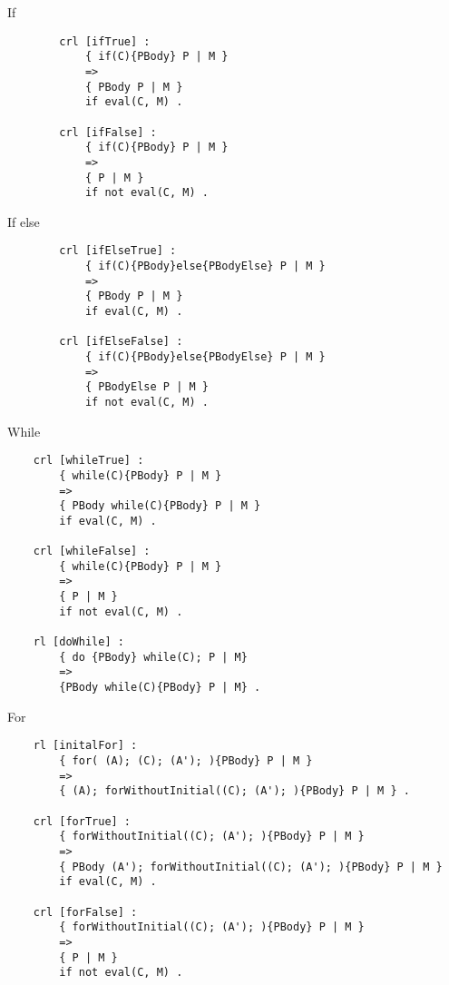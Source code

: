 \documentclass{beamer}
\begin{document}
    \begin{frame}[fragile]{If}
        \begin{verbatim}  
        crl [ifTrue] :
            { if(C){PBody} P | M }
            => 
            { PBody P | M } 
            if eval(C, M) .
    
        crl [ifFalse] :
            { if(C){PBody} P | M }
            => 
            { P | M } 
            if not eval(C, M) .
        \end{verbatim}
    \end{frame}

    \begin{frame}[fragile]{If else}
        \begin{verbatim}  
        crl [ifElseTrue] :
            { if(C){PBody}else{PBodyElse} P | M }
            => 
            { PBody P | M } 
            if eval(C, M) .
    
        crl [ifElseFalse] :
            { if(C){PBody}else{PBodyElse} P | M }
            => 
            { PBodyElse P | M } 
            if not eval(C, M) .
        \end{verbatim}
    \end{frame}

    \begin{frame}[fragile]{While}
        \begin{verbatim}  
    crl [whileTrue] :
        { while(C){PBody} P | M }
        => 
        { PBody while(C){PBody} P | M } 
        if eval(C, M) .

    crl [whileFalse] :
        { while(C){PBody} P | M }
        => 
        { P | M } 
        if not eval(C, M) .

    rl [doWhile] :
        { do {PBody} while(C); P | M}
        =>
        {PBody while(C){PBody} P | M} .
        \end{verbatim}
    \end{frame}

    \begin{frame}[fragile]{For}
        \begin{verbatim}  
    rl [initalFor] :
        { for( (A); (C); (A'); ){PBody} P | M }
        =>
        { (A); forWithoutInitial((C); (A'); ){PBody} P | M } .
    
    crl [forTrue] :
        { forWithoutInitial((C); (A'); ){PBody} P | M }
        =>
        { PBody (A'); forWithoutInitial((C); (A'); ){PBody} P | M }
        if eval(C, M) .
    
    crl [forFalse] :
        { forWithoutInitial((C); (A'); ){PBody} P | M }
        =>
        { P | M }
        if not eval(C, M) .
        \end{verbatim}
    \end{frame}
\end{document}
